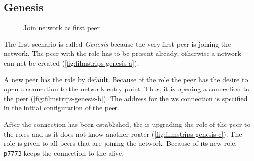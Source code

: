 \subsection{Genesis}

\begin{figure}[htb!]
  \centering
	\caption{Join network as first peer}
\label{fig:filmstrips-genesis}
\end{figure}

The first scenario is called \textit{Genesis} because the very first peer is joining the network. The peer with the role \signal has to be present already, otherwise a network can not be created (\vref{fig:filmstrips-genesis-a}). 

A new peer has the role \newbie by default. Because of the \newbie role the peer has the desire to open a connection to the network entry point. Thus, it is opening a  connection to the \signal peer (\vref{fig:filmstrips-genesis-b}). The address for the \gls{ws} connection is specified in the initial configuration of the peer.

After the connection has been established, the \signal is upgrading the role of the peer to the roles \router and \peer as it does not know another router (\vref{fig:filmstrips-genesis-c}). The role \peer is given to all peers that are joining the network.
Because of its new \router role, \lstinline{p7773} keeps the connection to the \signal alive.
